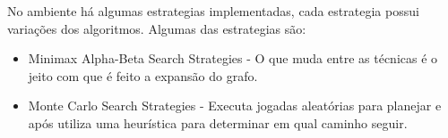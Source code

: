 No ambiente há algumas estrategias implementadas, cada estrategia possui variações dos algoritmos. Algumas das estrategias são:
\begin{itemize}
	\item Minimax Alpha-Beta Search Strategies - O que muda entre as técnicas é o jeito com que é feito a expansão do grafo.
	\item Monte Carlo Search Strategies - Executa jogadas aleatórias para planejar e após utiliza uma heurística para determinar em qual caminho seguir.
\end{itemize}

